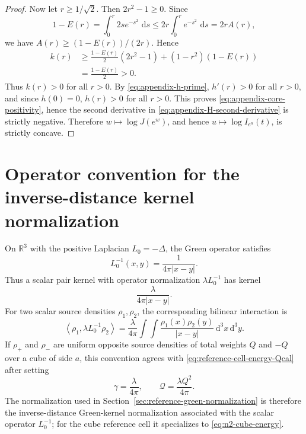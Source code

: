 \documentclass[11pt]{article}
\newcommand{\R}{\mathbb{R}}
\newcommand{\dd}{\,\mathrm{d}}
\newcommand{\braket}[2]{\left\langle #1,#2\right\rangle}
\begin{document}
\begin{proof}
Now let \(r\geq1/\sqrt2\).  Then \(2r^2-1\geq0\).  Since
\[
    1-E(r)
    =\int_0^r 2s e^{-s^2}\,\dd s
    \leq
    2r\int_0^r e^{-s^2}\,\dd s
    =2rA(r),
\]
we have \(A(r)\geq(1-E(r))/(2r)\).  Hence
\[
\begin{split}
    k(r)
    &\geq
    \frac{1-E(r)}{2}(2r^2-1)
    +(1-r^2)(1-E(r))  \\
    &=
    \frac{1-E(r)}{2}>0.
\end{split}
\]
Thus \(k(r)>0\) for all \(r>0\).  By \eqref{eq:appendix-h-prime},
\(h'(r)>0\) for all \(r>0\), and since \(h(0)=0\), \(h(r)>0\) for all
\(r>0\).  This proves \eqref{eq:appendix-core-positivity}, hence the second
derivative in \eqref{eq:appendix-H-second-derivative} is strictly negative.
Therefore \(w\mapsto\log J(e^w)\), and hence
\(u\mapsto\log I_{e^u}(t)\), is strictly concave.
\end{proof}


\section{Operator convention for the inverse-distance kernel normalization}
\label{app:inverse-distance-normalization}

On $\R^3$ with the positive Laplacian $L_0=-\Delta$, the Green operator satisfies
\[
    L_0^{-1}(x,y)=\frac{1}{4\pi|x-y|}.
\]
Thus a scalar pair kernel with operator normalization $\lambda L_0^{-1}$ has kernel
\[
    \frac{\lambda}{4\pi|x-y|}.
\]
For two scalar source densities $\rho_1,\rho_2$, the corresponding bilinear interaction is
\[
    \braket{\rho_1}{\lambda L_0^{-1}\rho_2}
    =\frac{\lambda}{4\pi}\int\int\frac{\rho_1(x)\rho_2(y)}{|x-y|}\dd^3x\dd^3y.
\]
If $\rho_+$ and $\rho_-$ are uniform opposite source densities of total weights $Q$ and $-Q$ over a cube of side $a$, this convention agrees with \eqref{eq:reference-cell-energy-Qcal} after setting
\[
    \gamma=\frac{\lambda}{4\pi},
    \qquad
    \mathcal Q=\frac{\lambda Q^2}{4\pi}.
\]
The normalization used in Section~\ref{sec:reference-green-normalization} is therefore the inverse-distance Green-kernel normalization associated with the scalar operator $L_0^{-1}$; for the cube reference cell it specializes to \eqref{eq:n2-cube-energy}.
\end{document}
